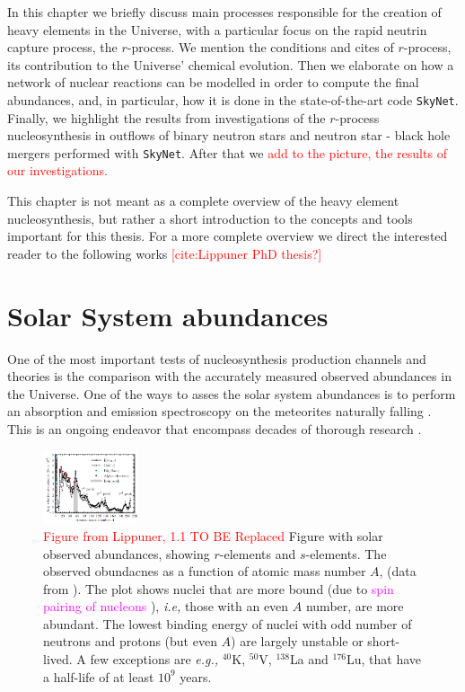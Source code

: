 \documentclass[11pt,a4paper,headinclude=true,DIV=14,BCOR=8mm,chapterprefix,listof=totoc,twoside,openright,abstracton]{scrbook}
\newcommand{\red}[1]{\textcolor{red}{#1}}
\newcommand{\magenta}[1]{\textcolor{magenta}{#1}} %
\begin{document}
In this chapter we briefly discuss main processes responsible for the creation of heavy elements in the Universe, with a particular focus on the rapid neutrin capture process, the $r$-process. We mention the conditions and cites of $r$-process, its contribution to the Universe' chemical evolution. Then we elaborate on how a network of nuclear reactions can be modelled in order to compute the final abundances, and, in particular, how it is done in the state-of-the-art code \texttt{SkyNet}. 
Finally, we highlight the results from investigations of the $r$-process nucleosynthesis in outflows of binary neutron stars and neutron star - black hole mergers performed with \texttt{SkyNet}. After that we \red{add to the picture, the results of our investigations.}

This chapter is not meant as a complete overview of the heavy element nucleosynthesis, but rather a short introduction to the concepts and tools important for this thesis. For a more complete overview we direct the interested reader to the following works \red{[cite:Lippuner PhD thesis?]}


\section{Solar System abundances}

One of the most important tests of nucleosynthesis production channels and theories is the comparison with the accurately measured observed abundances in the Universe. One of the ways to asses the solar system abundances is to perform an absorption and emission spectroscopy on the meteorites naturally falling \cite{Shaviv:2012}. This is an ongoing endeavor that encompass decades of thorough research \cite{Cameron:1973,Anders:1989,Grevesse:1998,Lodders:2003}. 

\begin{figure}[t]
    \centering
    \includegraphics[width=0.25\textwidth]{./figs/intro_nuc_LipF11.png}
    \caption{
        \red{Figure from Lippuner, 1.1 TO BE Replaced}
        Figure with solar observed abundances, showing $r$-elements and $s$-elements.
        The observed obundacnes as a function of atomic mass number $A$, (data from \cite{Lodders:2003}). The plot shows nuclei that are more bound (due to \magenta{spin pairing of nucleons} \cite{Moller:1993ed}), \textit{i.e,} those with an even $A$ number, are more abundant. The lowest binding energy of nuclei with odd number of neutrons and protons (but even $A$) are largely unstable or short-lived. A few exceptions are \textit{e.g.,} $^{40}$K, $^{50}$V, $^{138}$La and $^{176}$Lu, that have a half-life of at least $10^{9}$ years.
    }
    \label{fig:intro:nuc:solar1}
\end{figure}
\end{document}

